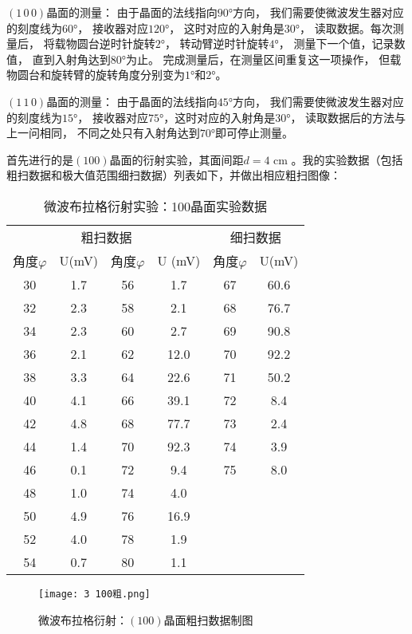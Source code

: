\documentclass[11pt]{article}
\begin{document}
$(1\,0\,0)$晶面的测量：
由于晶面的法线指向$90$°方向，
我们需要使微波发生器对应的刻度线为$60$°，
接收器对应$120$°，
这时对应的入射角是$30$°，
读取数据。每次测量后，
将载物圆台逆时针旋转$2$°，
转动臂逆时针旋转$4$°，
测量下一个值，记录数值，
直到入射角达到$80$°为止。
完成测量后，在测量区间重复这一项操作，
但载物圆台和旋转臂的旋转角度分别变为$1$°和$2$°。

$(1\,1\,0)$晶面的测量：
由于晶面的法线指向$45$°方向，
我们需要使微波发生器对应的刻度线为$15$°，
接收器对应$75$°，这时对应的入射角是$30$°，
读取数据后的方法与上一问相同，
不同之处只有入射角达到$70$°即可停止测量。

\bigskip
首先进行的是$(100)$晶面的衍射实验，其面间距$d=4\text{ cm }$。我的实验数据（包括粗扫数据和极大值范围细扫数据）列表如下，并做出相应粗扫图像：
\begin{table}[!ht]
    \centering
    \begin{tabular}{cccccc}
    \toprule
        \multicolumn{4}{c}{粗扫数据}  & \multicolumn{2}{c}{细扫数据}\\ 
        \cmidrule(lr){1-4}\cmidrule(lr){5-6}
        角度$\varphi$ & U(mV) & 角度$\varphi$ & U (mV)& 角度$\varphi$ & U(mV) \\ \midrule
        30 & 1.7 & 56 & 1.7 & 67 & 60.6 \\ 
        32 & 2.3 & 58 & 2.1 & 68 & 76.7 \\ 
        34 & 2.3 & 60 & 2.7 & 69 & 90.8 \\ 
        36 & 2.1 & 62 & 12.0  & 70 & 92.2 \\ 
        38 & 3.3 & 64 & 22.6 & 71 & 50.2 \\ 
        40 & 4.1 & 66 & 39.1 & 72 & 8.4 \\ 
        42 & 4.8 & 68 & 77.7 & 73 & 2.4 \\ 
        44 & 1.4 & 70 & 92.3 & 74 & 3.9 \\ 
        46 & 0.1 & 72 & 9.4 & 75 & 8.0  \\ 
        48 & 1.0  & 74 & 4.0 & ~ & ~ \\ 
        50 & 4.9 & 76 & 16.9 & ~ & ~ \\ 
        52 & 4.0  & 78 & 1.9 & ~ & ~ \\ 
        54 & 0.7 & 80 & 1.1 \\ \bottomrule
    \end{tabular}
    \caption{微波布拉格衍射实验：100晶面实验数据}
\end{table}

\begin{figure}[H]
    \centering
    \texttt{[image: 3 100粗.png]}
    \caption{微波布拉格衍射：$(100)$晶面粗扫数据制图}
\end{figure}
\end{document}
